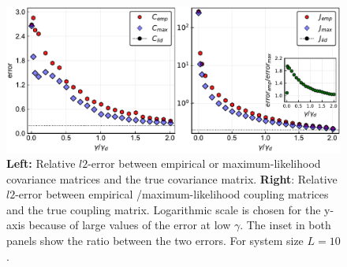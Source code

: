\documentclass[preprint,amsmath,amssymb,superscriptaddress,showpacs,pre]{revtex4-1}
\begin{document}
 \begin{figure}[!htb]
 			\centering\includegraphics[keepaspectratio=true,width=1.0\textwidth]{Figures/epsilon_error_L10_balanced_tree_100.pdf}
 		\hspace{1mm}
 	\caption{\textbf{Left:} Relative $l2$-error between empirical or maximum-likelihood covariance matrices and the true covariance matrix. \textbf{Right}: Relative $l2$-error between empirical /maximum-likelihood coupling matrices and the true coupling matrix. Logarithmic scale is chosen for the y-axis because of large values of the error at low $\gamma$. The inset in both panels show the ratio between the two errors. For system size $L=10$.}
 	\label{fig:error_1_L10}
 \end{figure}
\end{document}
